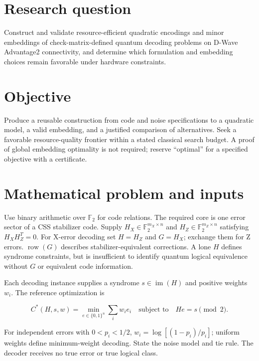 \documentclass[11pt,letterpaper]{article}
\begin{document}
\section{Research question}

Construct and validate resource-efficient quadratic encodings and minor embeddings of check-matrix-defined quantum decoding problems on D-Wave Advantage2 connectivity, and determine which formulation and embedding choices remain favorable under hardware constraints.\par

\section{Objective}

Produce a reusable construction from code and noise specifications to a quadratic model, a valid embedding, and a justified comparison of alternatives. Seek a favorable resource-quality frontier within a stated classical search budget. A proof of global embedding optimality is not required; reserve “optimal” for a specified objective with a certificate.\par

\clearpage

\section{Mathematical problem and inputs}

Use binary arithmetic over $\mathbb F_2$ for code relations. The required core is one error sector of a CSS stabilizer code. Supply $H_X\in\mathbb F_2^{m_X\times n}$ and $H_Z\in\mathbb F_2^{m_Z\times n}$ satisfying $H_XH_Z^T=0$. For X-error decoding set $H=H_Z$ and $G=H_X$; exchange them for Z errors. $\operatorname{row}(G)$ describes stabilizer-equivalent corrections. A lone $H$ defines syndrome constraints, but is insufficient to identify quantum logical equivalence without $G$ or equivalent code information.\par

Each decoding instance supplies a syndrome $s\in\operatorname{im}(H)$ and positive weights $w_i$. The reference optimization is\par

\[C^*(H,s,w)=\min_{e\in\{0,1\}^n}\sum_i w_i e_i\quad\text{subject to}\quad He=s\pmod 2.\]

For independent errors with $0<p_i<1/2$, $w_i=\log[(1-p_i)/p_i]$; uniform weights define minimum-weight decoding. State the noise model and tie rule. The decoder receives no true error or true logical class.\par
\end{document}
